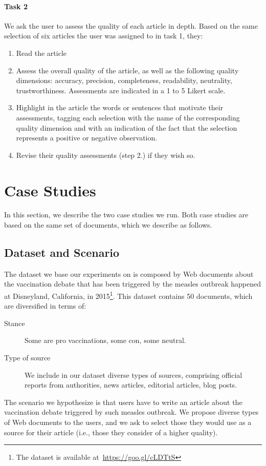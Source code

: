 \documentclass{llncs}
\begin{document}
\paragraph{Task 2}
We ask the user to assess the quality of each article in depth. Based on the same selection of six articles the user was assigned to in task 1, they:
\begin{enumerate}
\item Read the article
\item Assess the overall quality of the article, as well as the following quality dimensions: accuracy, precision, completeness, readability, neutrality, trustworthiness. Assessments are indicated in a 1 to 5 Likert scale.
\item Highlight in the article the words or sentences that motivate their assessments, tagging each selection with the name of the corresponding quality dimension and with an indication of the fact that the selection represents a positive or negative observation.
\item Revise their quality assessments (step 2.) if they wish so.
\end{enumerate}

\section{Case Studies}
\label{sec:results}
In this section, we describe the two case studies we run. Both case studies are based on the same set of documents, which we describe as follows.
\subsection{Dataset and Scenario}
The dataset we base our experiments on is composed by Web documents about the vaccination debate that has been triggered by the measles outbreak happened at Disneyland, California, in 2015\footnote{The dataset is available at~\url{https://goo.gl/cLDTtS}}. This dataset contains 50 documents, which are diversified in terms of:
\begin{description}
\item[Stance] Some are pro vaccinations, some con, some neutral.
\item[Type of source] We include in our dataset diverse types of sources, comprising official reports from authorities, news articles, editorial articles, blog posts.
\end{description}

The scenario we hypothesize is that users have to write an article about the vaccination debate triggered by such measles outbreak. We propose diverse types of Web documents to the users, and we ask to select those they would use as a source for their article (i.e., those they consider of a higher quality).
\end{document}
